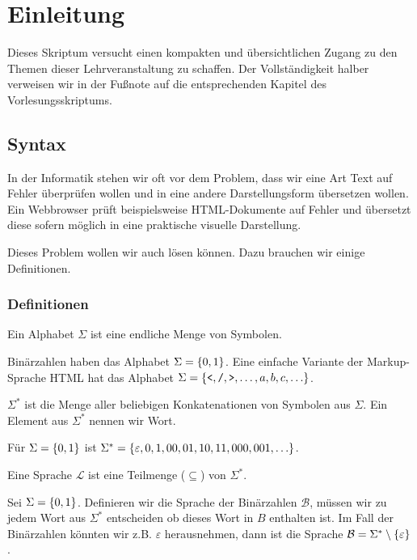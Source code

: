 \chapter{Einleitung}

Dieses Skriptum versucht einen kompakten und übersichtlichen Zugang zu den Themen
dieser Lehrveranstaltung zu schaffen. Der Vollständigkeit halber verweisen wir in der Fußnote auf die
entsprechenden Kapitel des Vorlesungsskriptums.

\section{Syntax}
In der Informatik stehen wir oft vor dem Problem, dass wir eine Art Text auf
Fehler überprüfen wollen und in eine andere Darstellungsform übersetzen wollen.
Ein Webbrowser prüft beispielsweise HTML-Dokumente auf Fehler und übersetzt diese
sofern möglich in eine praktische visuelle Darstellung.

Dieses Problem wollen wir auch lösen können. Dazu brauchen wir einige Definitionen.

\subsection{Definitionen}
\begin{defn}[Alphabet]
Ein Alphabet $\Sigma$ ist eine endliche Menge von Symbolen.
\end{defn}

Binärzahlen haben das Alphabet $\Sigma=\left\{0,1\right\}$.
Eine einfache Variante der Markup-Sprache HTML hat das Alphabet $\Sigma=\left\{\texttt{<},\texttt{/},\texttt{>},\ldots,a,b,c,\ldots\right\}$.

\begin{defn}
$\Sigma^*$ ist die Menge aller beliebigen Konkatenationen von Symbolen aus $\Sigma$.
Ein Element aus $\Sigma^*$ nennen wir Wort.
\end{defn}

Für $\Sigma=\left\{0,1\right\}$ ist $\Sigma^*=\left\{\varepsilon,0,1,00,01,10,11,000,001,\ldots\right\}$.

\begin{defn}[Sprache]
Eine Sprache $\mathcal{L}$ ist eine Teilmenge ($\subseteq$) von $\Sigma^*$.
\end{defn}

Sei $\Sigma=\left\{0,1\right\}$. Definieren wir die Sprache der Binärzahlen $\mathcal{B}$,
müssen wir zu jedem Wort aus $\Sigma^*$ entscheiden ob dieses Wort in $B$ enthalten ist.
Im Fall der Binärzahlen könnten wir z.B. $\varepsilon$ herausnehmen, dann ist die Sprache
$\mathcal{B}=\Sigma^* \setminus \left\{\varepsilon\right\}$.

